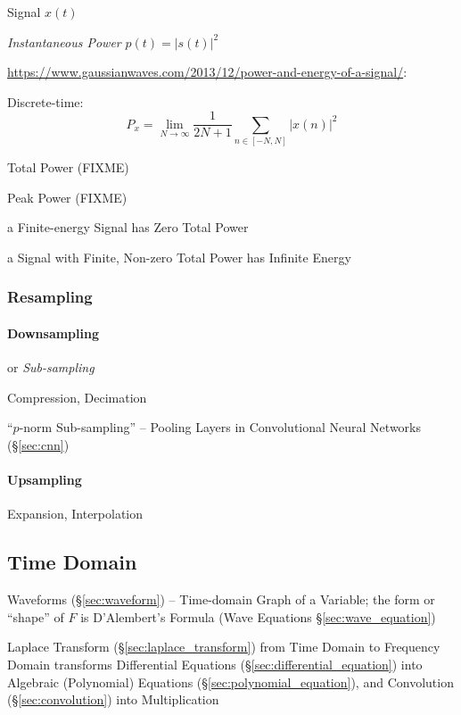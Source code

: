 Signal $x(t)$

\emph{Instantaneous Power} $p(t) = |s(t)|^2$

\url{https://www.gaussianwaves.com/2013/12/power-and-energy-of-a-signal/}:

Discrete-time:
\[
  P_x = \lim_{N\to\infty} \frac{1}{2N+1} \sum_{n \in [-N,N]}|x(n)|^2
\]

Total Power (FIXME)

Peak Power (FIXME)

a Finite-energy Signal has Zero Total Power

a Signal with Finite, Non-zero Total Power has Infinite Energy



\subsubsection{Resampling}\label{sec:resampling}

\paragraph{Downsampling}\label{sec:downsampling}\hfill

or \emph{Sub-sampling}

Compression, Decimation

``$p$-norm Sub-sampling'' -- Pooling Layers in Convolutional Neural Networks
(\S\ref{sec:cnn})



\paragraph{Upsampling}\label{sec:upsampling}\hfill

Expansion, Interpolation



\subsection{Time Domain}\label{sec:time_domain}

Waveforms (\S\ref{sec:waveform}) -- Time-domain Graph of a Variable; the form or
``shape'' of $F$ is D'Alembert's Formula (Wave Equations
\S\ref{sec:wave_equation})

Laplace Transform (\S\ref{sec:laplace_transform}) from Time Domain to Frequency
Domain transforms Differential Equations (\S\ref{sec:differential_equation})
into Algebraic (Polynomial) Equations (\S\ref{sec:polynomial_equation}), and
Convolution (\S\ref{sec:convolution}) into Multiplication

